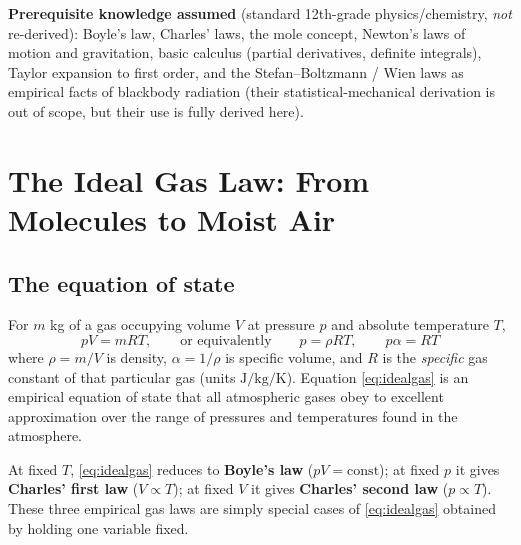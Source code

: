 \documentclass[11pt]{article}
\begin{document}
\noindent\textbf{Prerequisite knowledge assumed} (standard 12th-grade physics/chemistry, \emph{not} re-derived): Boyle's law, Charles' laws, the mole concept, Newton's laws of motion and gravitation, basic calculus (partial derivatives, definite integrals), Taylor expansion to first order, and the Stefan--Boltzmann / Wien laws as empirical facts of blackbody radiation (their statistical-mechanical derivation is out of scope, but their use is fully derived here).

\newpage
\section{The Ideal Gas Law: From Molecules to Moist Air}

\subsection{The equation of state}

For $m$ kg of a gas occupying volume $V$ at pressure $p$ and absolute temperature $T$,
\begin{equation}
pV = mRT, \qquad \text{or equivalently} \qquad p = \rho R T, \qquad p\alpha = RT
\label{eq:idealgas}
\end{equation}
where $\rho = m/V$ is density, $\alpha = 1/\rho$ is specific volume, and $R$ is the \emph{specific} gas constant of that particular gas (units $\si{\joule\per\kg\per\kelvin}$). Equation \eqref{eq:idealgas} is an empirical equation of state that all atmospheric gases obey to excellent approximation over the range of pressures and temperatures found in the atmosphere.

At fixed $T$, \eqref{eq:idealgas} reduces to \textbf{Boyle's law} ($pV=\text{const}$); at fixed $p$ it gives \textbf{Charles' first law} ($V\propto T$); at fixed $V$ it gives \textbf{Charles' second law} ($p\propto T$). These three empirical gas laws are simply special cases of \eqref{eq:idealgas} obtained by holding one variable fixed.
\end{document}
